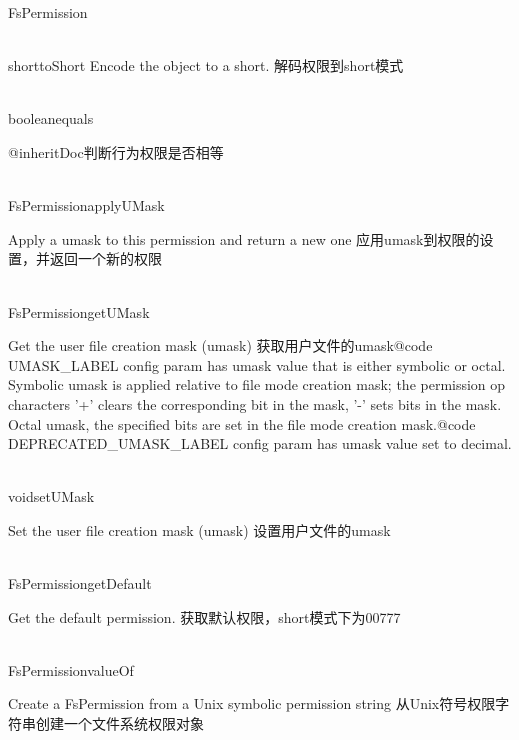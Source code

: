 \begin{XeClass}{FsPermission}
\begin{XeMethod}{\XePublic\\ }{short}{toShort}
 Encode the object to a short.
 解码权限到short模式

  \end{XeMethod}

  \begin{XeMethod}{\XePublic\\ }{boolean}{equals}
       
 {@inheritDoc}判断行为权限是否相等

  \end{XeMethod}

  \begin{XeMethod}{\XePublic\\ }{FsPermission}{applyUMask}
       
 Apply a umask to this permission and return a new one
 应用umask到权限的设置，并返回一个新的权限

  \end{XeMethod}

  \begin{XeMethod}{\XePublic\\ }{FsPermission}{getUMask}
       
 Get the user file creation mask (umask)
 获取用户文件的umask{@code UMASK{\_}LABEL} config param has umask value that is either symbolic
 or octal.
 Symbolic umask is applied relative to file mode creation mask;
 the permission op characters '+' clears the corresponding bit in the mask,
 '-' sets bits in the mask.
 Octal umask, the specified bits are set in the file mode creation mask.{@code DEPRECATED{\_}UMASK{\_}LABEL} config param has umask value set to decimal.

  \end{XeMethod}

  \begin{XeMethod}{\XePublic\\ }{void}{setUMask}
       
 Set the user file creation mask (umask)
 设置用户文件的umask

  \end{XeMethod}

  \begin{XeMethod}{\XePublic\\ }{FsPermission}{getDefault}
       
 Get the default permission.
 获取默认权限，short模式下为00777

  \end{XeMethod}

  \begin{XeMethod}{\XePublic\\ }{FsPermission}{valueOf}
       
 Create a FsPermission from a Unix symbolic permission string
 从Unix符号权限字符串创建一个文件系统权限对象

  \end{XeMethod}

\end{XeClass}
